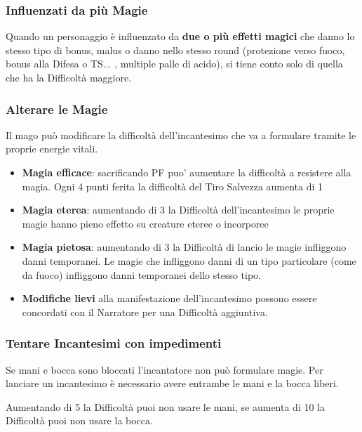 \subsubsection{Influenzati da più Magie}

Quando un personaggio è influenzato da \textbf{due o più effetti magici} che danno lo stesso tipo di bonus, malus o danno nello stesso round (protezione verso fuoco, bonus alla Difesa o TS... , multiple palle di acido), si tiene conto solo di quella che ha la Difficoltà maggiore.

\subsubsection{Alterare le Magie}

Il mago può modificare la difficoltà dell'incantesimo che va a formulare tramite le proprie energie vitali.

\begin{itemize}
	\item
	\textbf{Magia efficace}: sacrificando PF puo’ aumentare la difficoltà a resistere alla magia. Ogni 4 punti ferita la difficoltà del Tiro Salvezza aumenta di 1
	\item
	\textbf{Magia eterea}: aumentando di 3 la Difficoltà dell'incantesimo le proprie magie hanno pieno effetto su creature eteree o incorporee
	\item
	\textbf{Magia pietosa}: aumentando di 3 la Difficoltà di lancio le magie infliggono danni temporanei. 
	Le magie che infliggono danni di un tipo particolare (come da fuoco) infliggono danni temporanei dello stesso tipo.
	\item
	\textbf{Modifiche lievi} alla manifestazione dell'incantesimo possono essere concordati con il Narratore per una Difficoltà aggiuntiva. 
\end{itemize}

\subsubsection{Tentare Incantesimi con impedimenti} 

Se mani e bocca sono bloccati l'incantatore non può formulare magie. Per lanciare un incantesimo è necessario avere entrambe le mani e la bocca liberi.

Aumentando di 5 la Difficoltà puoi non usare le mani, se aumenta di 10 la Difficoltà puoi non usare la bocca.

